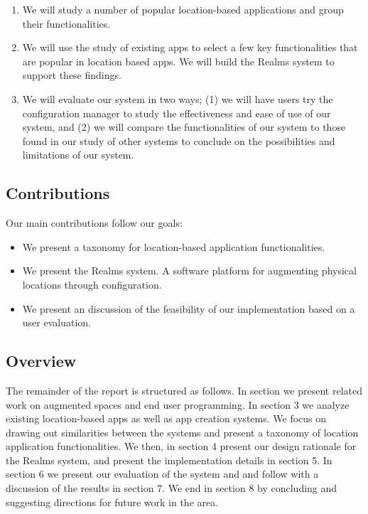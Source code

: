 \begin{enumerate}
	\item  We will study a number of popular location-based applications and group their functionalities. 
	\item We will use the study of existing apps to select a few key functionalities that are popular in location based apps. We will build the Realms system to support these findings.
	\item We will evaluate our system in two ways; (1) we will have users try the configuration manager to study the effectiveness and ease of use of our system, and (2) we will compare the functionalities of our system to those found in our study of other systems to conclude on the possibilities and limitations of our system.
\end{enumerate}

\subsection{Contributions} %
\label{sub:contributions}
Our main contributions follow our goals:

\begin{itemize}
	\item We present a taxonomy for location-based application functionalities.
	\item We present the Realms system. A software platform for augmenting physical locations through configuration.
	\item We present an discussion of the feasibility of our implementation based on a user evaluation.
\end{itemize}

\subsection{Overview} %
\label{sub:overview}
The remainder of the report is structured as follows. In section we present related work on augmented spaces and end user programming. In section 3 we analyze existing location-based apps as well as app creation systems. We focus on drawing out similarities between the systems and present a taxonomy of location application functionalities. We then, in section 4 present our design rationale for the Realms system, and present the implementation details in section 5. In section 6 we present our evaluation of the system and and follow with a discussion of the results in section 7. We end in section 8 by concluding and suggesting directions for future work in the area.

